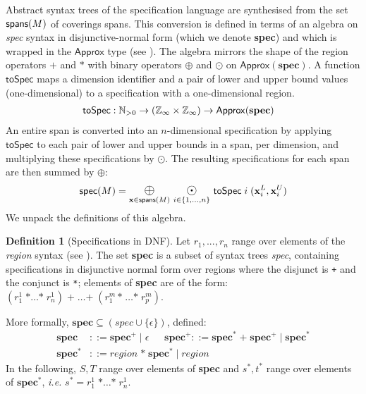 \documentclass[10pt,preprint,numbers]{sigplanconf}
\newcounter{block}
\theoremstyle{definition}
\newtheorem{definition}[block]{Definition}
\newcommand{\ie}{\emph{i.e.}}
\newcommand{\term}[1]{\texttt{#1}}
\newcommand{\vect}[1]{\textbf{#1}}
\begin{document}
\newcommand{\oplusbig}{\operatornamewithlimits{\term{\Large{$\oplus$}}}}
\newcommand{\odobig}{\operatornamewithlimits{\term{\Large{$\odot$}}}}
\newcommand{\bplus}{\operatornamewithlimits{\term{\Large{+}}}}
\newcommand{\tySum}[1]{#1^{\term{+}}}
\newcommand{\tyProd}[1]{#1^{\term{*}}}
\newcommand{\specDNF}{\textbf{spec}}

Abstract syntax trees of the specification language
are synthesised from the set $\textsf{spans}(M)$ of coverings spans.
This conversion is defined in terms
of an algebra on \textit{spec} syntax in disjunctive-normal form
(which we denote \specDNF{}) and which is wrapped
in the $\textsf{Approx}$ type (see
).  The algebra mirrors the shape
of the region operators $\term{+}$ and $\term{*}$ 
with binary operators $\oplus$ and $\odot$ on
$\mathsf{Approx}(\specDNF)$.
A function $\mathsf{toSpec}$ maps a dimension identifier
and a pair of lower and upper bound
values (one-dimensional) to a specification with a one-dimensional region.
\begin{align*}
\mathsf{toSpec} & : \mathbb{N}_{>0} \rightarrow (\domainVal{} \times \domainVal{}) \rightarrow \mathsf{Approx}(\specDNF)
\end{align*}
An entire span is converted into an $n$-dimensional
specification by applying $\mathsf{toSpec}$ to each
pair of lower and upper bounds in a span, per dimension, and multiplying these
specifications by $\odot$. The resulting specifications for
each span are then summed by $\oplus$:
\begin{equation*}
\textsf{spec}(M) =
\oplusbig\limits_{\vect{x} \in \spanOp(M)} \,
\odobig\limits_{i \in \{1, \ldots, n\}} \, \mathsf{toSpec} \; i \; (\vect{x}^L_i, \vect{x}^U_i)
\end{equation*}
We unpack the definitions of this algebra.

\begin{definition}[Specifications in DNF]
Let $r_1, ..., r_n$ range over elements of the \textit{region}
syntax (see ).
The set \specDNF{} is a subset of syntax trees \textit{spec},
containing specifications in disjunctive normal form over regions
where the disjunct is \term{+} and the conjunct is \term{*}; 
 elements of \specDNF{} are of the form:
$
(r^1_{1} \; \term{*} \ldots \term{*} \; r^1_n)\; \term{+} \; \ldots
\term{+} \; (r^m_1 \, \term{*} \; \ldots \term{*} \; r^m_p)
$.

More formally, $\specDNF \subseteq (\textit{spec} \cup \{\epsilon\})$, defined:
\begin{align*}
\specDNF{} & ::= \tySum{\specDNF} \mid \epsilon \quad\;\;
\tySum{\specDNF} ::= \tyProd{\specDNF} \; \term{+} \; \tySum{\specDNF} \mid
  \tyProd{\specDNF} \\
\tyProd{\specDNF} & ::= \textit{region} \; \term{*} \; \tyProd{\specDNF} \mid
   \textit{region}
\end{align*}
In the following, $S, T$ range over elements of
\specDNF{} and $\tyProd{s}, \tyProd{t}$ range over elements
of $\tyProd{\specDNF}$, \ie{} $\tyProd{s} = r^1_{1} \; \term{*}
\ldots \term{*} \; r^1_n$.
\end{definition}
\end{document}
